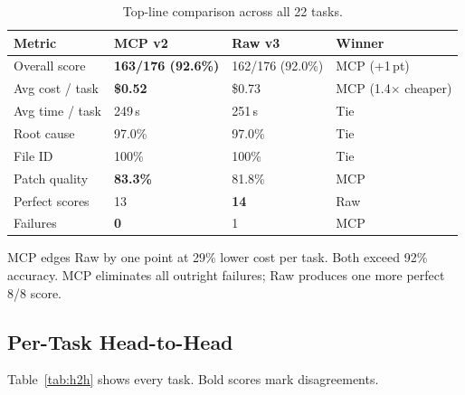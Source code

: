 \begin{table}[h]
\centering
\caption{Top-line comparison across all 22 tasks.}\label{tab:exec-summary}
\begin{tabular}{llll}
\toprule
\textbf{Metric} & \textbf{MCP v2} & \textbf{Raw v3} & \textbf{Winner} \\
\midrule
Overall score      & \textbf{163/176 (92.6\%)} & 162/176 (92.0\%) & MCP (+1\,pt) \\
Avg cost / task    & \textbf{\$0.52}            & \$0.73            & MCP (1.4$\times$ cheaper) \\
Avg time / task    & 249\,s                     & 251\,s            & Tie \\
Root cause         & 97.0\%                     & 97.0\%            & Tie \\
File ID            & 100\%                      & 100\%             & Tie \\
Patch quality      & \textbf{83.3\%}            & 81.8\%            & MCP \\
Perfect scores     & 13                         & \textbf{14}       & Raw \\
Failures           & \textbf{0}                 & 1                 & MCP \\
\bottomrule
\end{tabular}
\end{table}

\noindent
MCP edges Raw by one point at 29\% lower cost per task.
Both exceed 92\% accuracy.
MCP eliminates all outright failures; Raw produces one more perfect
8/8 score.

\subsection{Per-Task Head-to-Head}\label{sec:h2h}

Table~\ref{tab:h2h} shows every task.
Bold scores mark disagreements.


